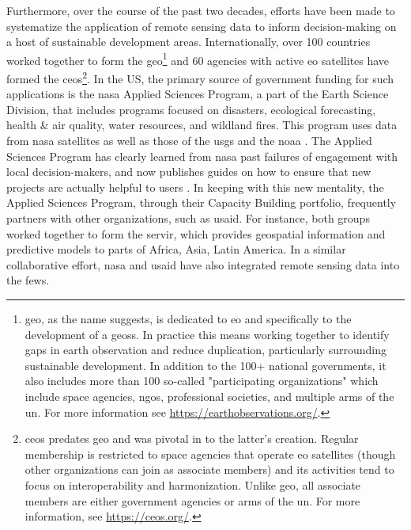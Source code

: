 Furthermore, over the course of the past two decades, efforts have been made to systematize the application of remote sensing data to inform decision-making on a host of sustainable development areas. Internationally, over 100 countries worked together to form the \ac{geo}\footnote{\ac{geo}, as the name suggests, is dedicated to \ac{eo} and specifically to the development of a \ac{geoss}. In practice this means working together to identify gaps in earth observation and reduce duplication, particularly surrounding sustainable development. In addition to the 100+ national governments, it also includes more than 100 so-called "participating organizations" which include space agencies, \acp{ngo}, professional societies, and multiple arms of the \ac{un}. For more information see \url{https://earthobservations.org/}.} and 60 agencies with active \ac{eo} satellites have formed the \ac{ceos}\footnote{\ac{ceos} predates \ac{geo} and was pivotal in to the latter's creation. Regular membership is restricted to space agencies that operate \ac{eo} satellites (though other organizations can join as associate members) and its activities tend to focus on interoperability and harmonization. Unlike \ac{geo}, all associate members are either government agencies or arms of the \ac{un}. For more information, see \url{https://ceos.org/}.}. In the US, the primary source of government funding for such applications is the \ac{nasa} Applied Sciences Program, a part of the Earth Science Division, that includes programs focused on disasters, ecological forecasting, health \& air quality, water resources, and wildland fires. This program uses data from \ac{nasa} satellites as well as those of the \ac{usgs} and the \ac{noaa} \cite{khanLongHardJourney2009, nasaappliedsciencesprogramWhatWeNASA, nasaearthscienceappliedsciencesNASAAppliedSciences2021}. The Applied Sciences Program has clearly learned from \ac{nasa} past failures of engagement with local decision-makers, and now publishes guides on how to ensure that new projects are actually helpful to users \cite{irwinSERVIRServicePlanning2017}. In keeping with this new mentality, the Applied Sciences Program, through their Capacity Building portfolio, frequently partners with other organizations, such as \ac{usaid}. For instance, both groups worked together to form the \ac{servir}, which provides geospatial information and predictive models to parts of Africa, Asia, Latin America. In a similar collaborative effort, \ac{nasa} and \ac{usaid} have also integrated remote sensing data into the \ac{fews}. 

